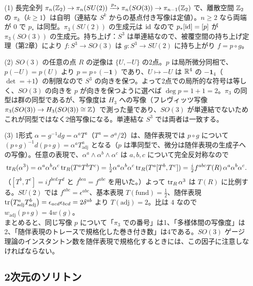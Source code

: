\begin{solution}
(1) 長完全列 $\pi_n(\mathbb{Z}_2)\to\pi_n(SU(2))\xrightarrow{p_*}\pi_n(SO(3))\to\pi_{n-1}(\mathbb{Z}_2)$ で、離散空間 $\mathbb{Z}_2$ の $\pi_k$（$k\ge1$）は自明（連結な $S^k$ からの基点付き写像は定値）。$n\ge2$ なら両端が $0$ で $p_*$ は同型。$\pi_3(SU(2))$ の生成元は $\mathrm{id}$ なので $p_*[\mathrm{id}]=[p]$ が $\pi_3(SO(3))$ の生成元。持ち上げ：$S^3$ は単連結なので、被覆空間の持ち上げ定理（第2章）により $f\colon S^3\to SO(3)$ は $g\colon S^3\to SU(2)$ に持ち上がり $f=p\circ g$。

(2) $SO(3)$ の任意の点 $R$ の逆像は $\{U,-U\}$ の2点。$p$ は局所微分同相で、$p(-U)=p(U)$ より $p=p\circ(-\mathbf 1)$ であり、$U\mapsto-U$ は $\mathbb{R}^4$ の $-\mathbf 1_4$（$\det=+1$）の制限なので $S^3$ の向きを保つ。よって2点での局所的な符号は等しく、$SO(3)$ の向きを $p$ が向きを保つように選べば $\deg p=1+1=2$。$\pi_3$ の同型は群の同型であるが、写像度は $H_3$ への写像（フレヴィッツ写像 $\pi_3(SO(3))\to H_3(SO(3))\cong\mathbb{Z}$）で測った量であり、$SO(3)$ が単連結でないためこれが同型ではなく2倍写像になる。単連結な $S^3$ では両者は一致する。

(3) 1形式 $\alpha=g^{-1}dg=\alpha^aT^a$（$T^a=\sigma^a/2$）は、随伴表現では $p\circ g$ について $(p\circ g)^{-1}d(p\circ g)=\alpha^aT^a_{\mathrm{adj}}$ となる（$p$ は準同型で、微分は随伴表現の生成子への写像）。任意の表現で、$\alpha^a\wedge\alpha^b\wedge\alpha^c$ は $a,b,c$ について完全反対称なので
\[
\tr_R(\alpha^3)=\alpha^a\alpha^b\alpha^c\tr_R(T^aT^bT^c)=\tfrac12\alpha^a\alpha^b\alpha^c\tr_R(T^a[T^b,T^c])=\tfrac{i}{2}f^{abc}T(R)\,\alpha^a\alpha^b\alpha^c .
\]
（$[T^b,T^c]=if^{bcd}T^d$ と $f^{bca}=f^{abc}$ を用いた。）よって $\tr_R\alpha^3$ は $T(R)$ に比例する。$SU(2)$ では $f^{abc}=\epsilon^{abc}$、基本表現 $T(\text{fund})=\frac12$、随伴表現 $\tr(T^a_{\mathrm{adj}}T^b_{\mathrm{adj}})=\epsilon_{acd}\epsilon_{bcd}=2\delta^{ab}$ より $T(\mathrm{adj})=2$。比は $4$ なので $w_{\mathrm{adj}}(p\circ g)=4w(g)$。\\
まとめると、同じ写像 $p$ について「$\pi_3$ での番号」は1、「多様体間の写像度」は2、「随伴表現のトレースで規格化した巻き付き数」は4である。$SO(3)$ ゲージ理論のインスタントン数を随伴表現で規格化するときには、この因子に注意しなければならない。
\end{solution}

\subsection{2次元のソリトン}

